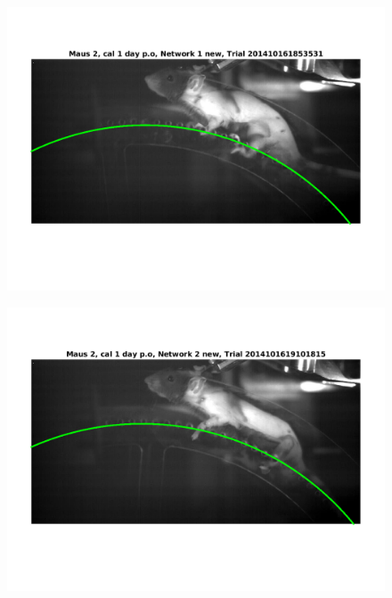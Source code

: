 \documentclass[
	fontsize=12pt,
	paper=a4,
	twoside=false,
	numbers=noenddot,
	plainheadsepline,
	toc=listof,
	toc=bibliography
]{scrartcl}
\begin{document}
\begin{figure} [htb]
	\centering
	\includegraphics[scale = 0.6]{images/mouse2/result_Maus_2_cal_1_day_Network_1_new.png}
\end{figure}
\begin{figure} [hb] \centering
	\includegraphics[scale = 0.6]{images/mouse2/result_Maus_2_cal_1_day_Network_2_new.png}
\end{figure}


\end{document}
